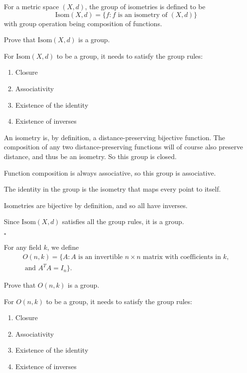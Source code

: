 \documentclass[a4paper]{article}
\begin{document}


\begin{questionbody}
For a metric space $(X, d)$, the group of isometries is defined to be \[
\mathrm{Isom}(X, d) = \{ f : f \text{ is an isometry of } (X, d) \}
\] with group operation being composition of functions.

Prove that $\mathrm{Isom}(X, d)$ is a group.
\end{questionbody}

For $\mathrm{Isom}(X, d)$ to be a group, it needs to satisfy the group rules:
\begin{enumerate}[1.]
\item Closure
\item Associativity
\item Existence of the identity
\item Existence of inverses
\end{enumerate}

An isometry is, by definition, a distance-preserving bijective function. The composition of any two distance-preserving functions will of course also preserve distance, and thus be an isometry. So this group is closed.

Function composition is always associative, so this group is associative.

The identity in the group is the isometry that maps every point to itself.

Isometries are bijective by definition, and so all have inverses.

Since $\mathrm{Isom}(X, d)$ satisfies all the group rules, it is a group.

\hfill $\square$



\begin{questionbody}
For any field $k$, we define \begin{equation*}
\begin{split}
O(n, k) = \{ A : A \text{ is an invertible } n \times n \text{ matrix with coefficients in } k, \\
\text{ and } A^T A = I_n \}.
\end{split}
\end{equation*}

Prove that $O(n, k)$ is a group.
\end{questionbody}

For $O(n, k)$ to be a group, it needs to satisfy the group rules:
\begin{enumerate}[1.]
\item Closure
\item Associativity
\item Existence of the identity
\item Existence of inverses
\end{enumerate}
\end{document}
